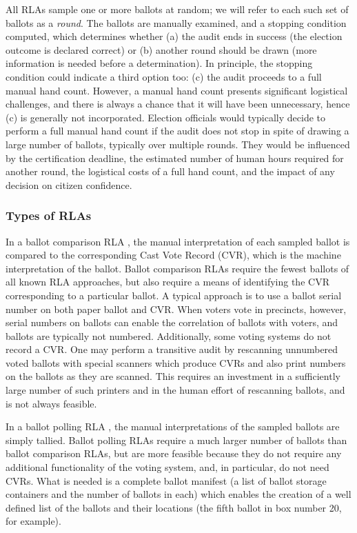All RLAs sample one or more ballots at random; we will refer to each such set of ballots as a {\em round}. The ballots are manually examined, and a stopping condition computed, which determines whether (a) the audit ends in success (the election outcome is declared correct) or (b) another round should be drawn (more information is needed before a determination). In principle, the stopping condition could indicate a third option too: (c) the audit proceeds to a full manual hand count. However, a manual hand count presents significant logistical challenges, and there is always a chance that it will have been unnecessary, hence (c) is generally not incorporated. Election officials would typically decide to perform a full manual hand count if the audit does not stop in spite of drawing a large number of ballots, typically over multiple rounds. They would be influenced by the certification deadline, the estimated number of human hours required for another round, the logistical costs of a full hand count, and the impact of any decision on citizen confidence. 

\subsubsection{Types of RLAs}
In a ballot comparison RLA \cite{RLA}, the manual interpretation of each sampled ballot is compared to the corresponding Cast Vote Record (CVR), which is the machine interpretation of the ballot. Ballot comparison RLAs require the fewest ballots of all known RLA approaches, but also require a means of identifying the CVR corresponding to a particular ballot. A typical approach is to use a ballot serial number on both paper ballot and CVR. When voters vote in precincts, however, serial numbers on ballots can enable the correlation of ballots with voters, and ballots are typically not numbered. Additionally, some voting systems do not record a CVR. One may perform a transitive audit by rescanning unnumbered voted ballots with special scanners which produce CVRs and also print numbers on the ballots as they are scanned. This requires an investment in a sufficiently large number of such printers and in the human effort of rescanning ballots, and is not always feasible. 

In a ballot polling RLA \cite{RLA}, the manual interpretations of the sampled ballots are simply tallied. Ballot polling RLAs require a much larger number of ballots than ballot comparison RLAs, but are more feasible because they do not require any additional functionality of the voting system, and, in particular, do not need CVRs. What is needed is a complete ballot manifest (a list of ballot storage containers and the number of ballots in each) which enables the creation of a well defined list of the ballots and their locations (the fifth ballot in box number 20, for example).  

